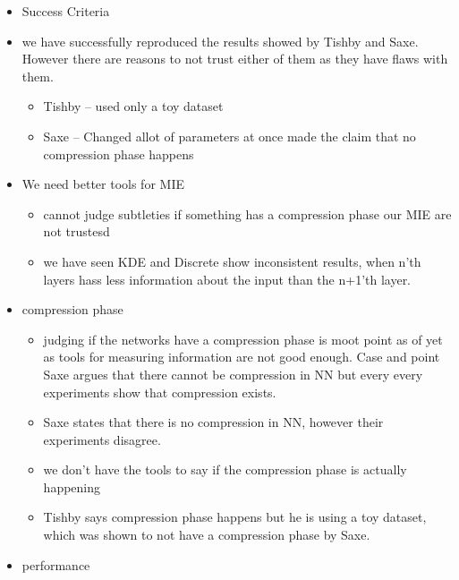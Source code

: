 \documentclass[dissertation.tex]{subfiles}
\begin{document}
\begin{itemize}
  \item{
      Success Criteria
    }
  \item{
      we have successfully reproduced the results showed by Tishby and Saxe.
      However there are reasons to not trust either of them as they have flaws
      with them.
      \begin{itemize}
        \item{
            Tishby -- used only a toy dataset 
          }
        \item{
            Saxe -- Changed allot of parameters at once made the claim that no
            compression phase happens
          }
      \end{itemize}
    }
  \item{
      We need better tools for MIE
      \begin{itemize}
        \item{
            cannot judge subtleties if something has a compression phase our MIE
            are not trustesd
          }
        \item{
            we have seen KDE and Discrete show inconsistent results, when n'th
            layers hass less information about the input than the n+1'th layer.
          }
      \end{itemize}
    }
  \item{
      compression phase 
      \begin{itemize}
        \item{
            judging if the networks have a compression phase is moot point as of
            yet as tools for measuring information are not good enough. Case and
            point Saxe argues that there cannot be compression in NN but every
            every experiments show that compression exists.
          }
        \item{
            Saxe states that there is no compression in NN, however their
            experiments disagree. 
          }
        \item{
            we don't have the tools to say if the compression phase is actually
            happening
          }
        \item{
            Tishby says compression phase happens but he is using a toy dataset,
            which was shown to not have a compression phase by Saxe.
          }
      \end{itemize}
    }
  \item{
      performance
    }
\end{itemize}
\end{document}
